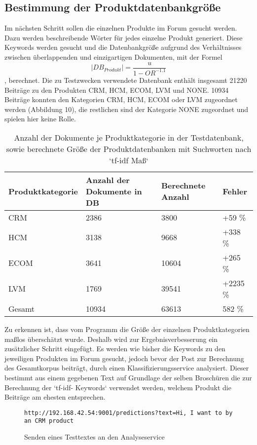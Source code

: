 \subsection{Bestimmung der Produktdatenbankgröße}

Im nächsten Schritt sollen die einzelnen Produkte im Forum gesucht werden. Dazu werden beschreibende Wörter für jedes einzelne Produkt generiert. Diese Keywords werden gesucht und die Datenbankgröße aufgrund des Verhältnisses zwischen überlappenden und einzigartigen Dokumenten, mit der Formel  \[|DB_{Produkt}| = \frac{u}{1-OR^{-1.1}}\] \cite{lu2008efficient}, berechnet. Die zu Testzwecken verwendete Datenbank enthält insgesamt 21220 Beiträge zu den Produkten CRM, HCM, ECOM, LVM und NONE. 10934 Beiträge konnten den Kategorien CRM, HCM, ECOM oder LVM zugeordnet werden (Abbildung 10), die restlichen sind der Kategorie NONE zugeordnet und spielen hier keine Rolle.

\begin{table}[h!]
\centering 
\begin{tabular}{ | p{3cm} | l  | l | l |}
\hline
Produktkategorie & Anzahl der Dokumente in DB & Berechnete Anzahl & Fehler\\ \hline
CRM & 2386 & 3800 & +59 \%\\ \hline
HCM & 3138 & 9668 & +338 \%\\ \hline
ECOM & 3641 & 10604 & +265 \%\\ \hline
LVM & 1769 & 39541 & +2235 \%\\ \hline
Gesamt & 10934 & 63613 & 582 \% \\ \hline
\end{tabular}
\caption{Anzahl der Dokumente je Produktkategorie in der Testdatenbank, sowie berechnete Größe der Produktdatenbanken mit Suchworten nach `tf-idf Maß`}
\end{table}

Zu erkennen ist, dass vom Programm die Größe der einzelnen Produktkategorien maßlos überschätzt wurde. Deshalb wird zur Ergebnisverbesserung ein zusätzlicher Schritt eingefügt. Es werden wie bisher die Keywords zu den jeweiligen Produkten im Forum gesucht, jedoch bevor der Post zur Berechnung des Gesamtkorpus beiträgt, durch einen Klassifizierungsservice \cite{n2o} analysiert. Dieser bestimmt aus einem gegebenen Text auf Grundlage der selben Broschüren die zur Berechnung der `tf-idf- Keywords` verwendet werden, welchem Produkt die Beiträge am ehesten entsprechen.

\begin{figure}[h!]
\begin{lstlisting}[language=HTML5]
http://192.168.42.54:9001/predictions?text=Hi, I want to by an CRM product
\end{lstlisting}
\caption{Senden eines Testtextes an den Analyseservice}
\end{figure}

